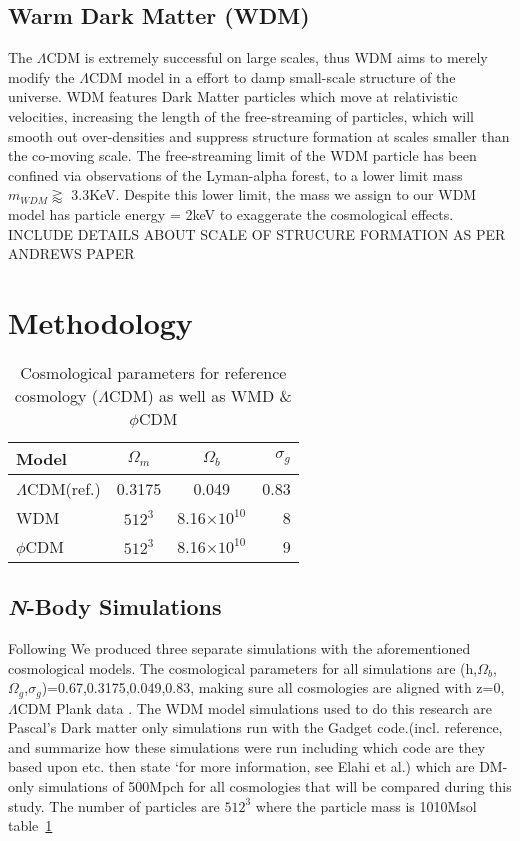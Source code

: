 \documentclass[a4paper,fleqn,usenatbib]{mnras}
\def \qcdm{$\phi$CDM}
\begin{document}
\subsection{Warm Dark Matter  (WDM)} 
The $\Lambda$CDM is extremely successful on large scales, thus WDM aims to merely modify the $\Lambda$CDM model in a effort to damp small-scale structure of the universe. WDM features Dark Matter particles which move at relativistic velocities, increasing the length of the free-streaming of particles, which will smooth out over-densities and suppress structure formation at scales smaller than the co-moving scale\citep{Bode_01}.
The free-streaming limit of the WDM particle has been confined via observations of the Lyman-alpha forest, to a lower limit mass $m_{WDM}\gtrapprox$ 3.3KeV. \citep{Viel_13} Despite this lower limit, the mass we assign to our WDM model has particle energy = 2keV to exaggerate the cosmological effects. INCLUDE DETAILS ABOUT SCALE OF STRUCURE FORMATION AS PER ANDREWS PAPER  

\section{Methodology}\label{SiriusBlack}

\begin{table}
	\centering
	\caption{Cosmological parameters for reference cosmology ($\Lambda$CDM) as well as WMD \& \qcdm}
	\label{tab:1}
	\begin{tabular}{lccr} %
		\hline
		Model & $\Omega_{m}$ & $\Omega_{b}$ & $\sigma_{g}$  \\
		\hline
		$\Lambda$CDM(ref.) & 0.3175 & 0.049 & 0.83\\
		WDM & $512^{3}$ & 8.16$\times$$10^{10}$ & 8 \\
		\qcdm & $512^{3}$ & 8.16$\times$$10^{10}$ & 9 \\
		\hline
	\end{tabular}
\end{table}

\subsection{\textit{N}-Body Simulations}
Following \citep{Elahi_15} We produced three separate simulations with the aforementioned cosmological models. The cosmological parameters for all simulations are (h,$\Omega_{b}$,$\Omega_{g}$,$\sigma_{g}$)=0.67,0.3175,0.049,0.83, making sure all cosmologies are aligned with z=0, $\Lambda$CDM Plank data \citep{Plank_14b,Plank_16}. The WDM model  simulations used to do this research are Pascal’s Dark matter only simulations run with the Gadget code.(incl. reference, and summarize how these simulations were run including which code are they based upon etc. then state ‘for more information, see Elahi et al.) which are DM-only simulations of 500Mpch for all cosmologies that will be compared during this study. The number of particles are $512^{3}$ where the particle mass is 1010Msol table~\ref{tab:1}
\end{document}
